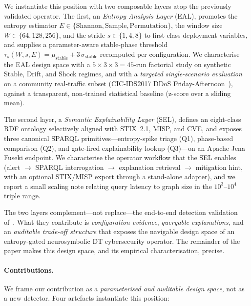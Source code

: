 \documentclass[runningheads]{llncs}
\newcommand{\taus}{\ensuremath{\tau_{s}}}
\begin{document}
We instantiate this position with two composable layers atop the
previously validated operator. The first, an \emph{Entropy Analysis
Layer} (EAL), promotes the entropy estimator $E \in \{\mathrm{Shannon},
\mathrm{Sample}, \mathrm{Permutation}\}$, the window size
$W \in \{64, 128, 256\}$, and the stride $s \in \{1, 4, 8\}$ to
first-class deployment variables, and supplies a parameter-aware
stable-phase threshold
$\taus(W, s, E) = \mu_{\mathrm{stable}} + 3\,\sigma_{\mathrm{stable}}$
recomputed per configuration. We characterise the EAL design space with
a $5 \times 3 \times 3 = 45$-run factorial study on synthetic Stable,
Drift, and Shock regimes, and with a \emph{targeted single-scenario
evaluation} on a community real-traffic subset (CIC-IDS2017 DDoS
Friday-Afternoon~\cite{cicids2017}), against a transparent, non-trained
statistical baseline (z-score over a sliding mean).

The second layer, a \emph{Semantic Explainability Layer} (SEL), defines
an eight-class RDF ontology selectively aligned with STIX~2.1, MISP,
and CVE, and exposes three canonical SPARQL primitives---entropy-spike
triage (Q1), phase-based comparison (Q2), and gate-fired explainability
lookup (Q3)---on an Apache Jena Fuseki endpoint. We characterise the
operator workflow that the SEL enables (alert $\to$ SPARQL
interrogation $\to$ explanation retrieval $\to$ mitigation hint, with
an optional STIX/MISP export through a stand-alone adapter), and we
report a small scaling note relating query latency to graph size in the
$10^{3}$--$10^{4}$ triple range.

The two layers complement---not replace---the end-to-end detection
validation of~\cite{paper3}. What they contribute is
\emph{configuration evidence}, \emph{queryable explanations}, and an
\emph{auditable trade-off structure} that exposes the navigable design
space of an entropy-gated neurosymbolic DT cybersecurity operator. The
remainder of the paper makes this design space, and its empirical
characterisation, precise.

\paragraph{Contributions.} We frame our contribution as a
\emph{parameterised and auditable design space}, not as a new detector.
Four artefacts instantiate this position:
\end{document}
